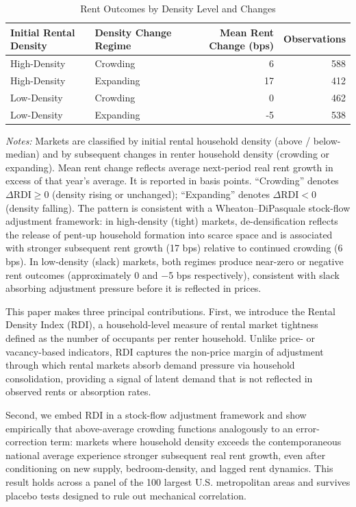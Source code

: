 \documentclass[pdflatex,sn-basic]{sn-jnl}%
\theoremstyle{thmstyleone}%
\theoremstyle{thmstyletwo}%
\theoremstyle{thmstylethree}%
\begin{document}
\begin{table}[htbp]
\centering
\caption{Rent Outcomes by Density Level and Changes }
\label{tab:wheaton_dipasquale_density}
\begin{tabular}{l l r r}
\hline
Initial Rental Density & Density Change Regime & Mean Rent Change (bps) & Observations \\
\hline
High-Density & Crowding     & 6  & 588 \\
High-Density & Expanding	& 17  & 412 \\
Low-Density  & Crowding     & 0  & 462 \\
Low-Density  & Expanding 	& -5  & 538 \\
\hline
\end{tabular}
\begin{minipage}{0.9\linewidth}
\footnotesize
\emph{Notes:} Markets are classified by initial rental household density (above / below-median) and by subsequent changes in renter household density (crowding or expanding). Mean rent change reflects average next-period real rent growth in excess of that year's average. It is reported in basis points. ``Crowding'' denotes $\Delta\text{RDI} \geq 0$ (density rising or unchanged); 
``Expanding'' denotes $\Delta\text{RDI} < 0$ (density falling). The pattern is consistent 
with a Wheaton--DiPasquale stock-flow adjustment framework: in high-density (tight) markets, 
de-densification reflects the release of pent-up household formation into scarce space and is 
associated with stronger subsequent rent growth (17 bps) relative to continued crowding (6 bps). 
In low-density (slack) markets, both regimes produce near-zero or negative rent outcomes 
(approximately 0 and $-$5 bps respectively), consistent with slack absorbing adjustment 
pressure before it is reflected in prices.
\end{minipage}
\end{table}

This paper makes three principal contributions. First, we introduce the Rental 
Density Index (RDI), a household-level measure of rental market tightness defined 
as the number of occupants per renter household. Unlike price- or vacancy-based 
indicators, RDI captures the non-price margin of adjustment through which rental 
markets absorb demand pressure via household consolidation, providing a signal of 
latent demand that is not reflected in observed rents or absorption rates.

Second, we embed RDI in a stock-flow adjustment framework and show empirically 
that above-average crowding functions analogously to an error-correction term: markets where 
household density exceeds the contemporaneous national average experience 
stronger subsequent real rent growth, even after conditioning on new supply, bedroom-density, and 
lagged rent dynamics. This result holds across a panel of the 100 largest U.S. 
metropolitan areas and survives placebo tests designed to rule out mechanical 
correlation.
\end{document}
